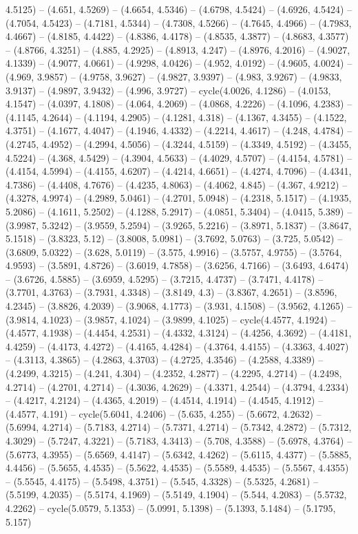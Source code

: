 4.5125) -- (4.651, 4.5269) -- (4.6654, 4.5346) -- (4.6798, 4.5424) -- (4.6926, 4.5424) -- (4.7054, 4.5423) -- (4.7181, 4.5344) -- (4.7308, 4.5266) -- (4.7645, 4.4966) -- (4.7983, 4.4667) -- (4.8185, 4.4422) -- (4.8386, 4.4178) -- (4.8535, 4.3877) -- (4.8683, 4.3577) -- (4.8766, 4.3251) -- (4.885, 4.2925) -- (4.8913, 4.247) -- (4.8976, 4.2016) -- (4.9027, 4.1339) -- (4.9077, 4.0661) -- (4.9298, 4.0426) -- (4.952, 4.0192) -- (4.9605, 4.0024) -- (4.969, 3.9857) -- (4.9758, 3.9627) -- (4.9827, 3.9397) -- (4.983, 3.9267) -- (4.9833, 3.9137) -- (4.9897, 3.9432) -- (4.996, 3.9727) -- cycle(4.0026, 4.1286) -- (4.0153, 4.1547) -- (4.0397, 4.1808) -- (4.064, 4.2069) -- (4.0868, 4.2226) -- (4.1096, 4.2383) -- (4.1145, 4.2644) -- (4.1194, 4.2905) -- (4.1281, 4.318) -- (4.1367, 4.3455) -- (4.1522, 4.3751) -- (4.1677, 4.4047) -- (4.1946, 4.4332) -- (4.2214, 4.4617) -- (4.248, 4.4784) -- (4.2745, 4.4952) -- (4.2994, 4.5056) -- (4.3244, 4.5159) -- (4.3349, 4.5192) -- (4.3455, 4.5224) -- (4.368, 4.5429) -- (4.3904, 4.5633) -- (4.4029, 4.5707) -- (4.4154, 4.5781) -- (4.4154, 4.5994) -- (4.4155, 4.6207) -- (4.4214, 4.6651) -- (4.4274, 4.7096) -- (4.4341, 4.7386) -- (4.4408, 4.7676) -- (4.4235, 4.8063) -- (4.4062, 4.845) -- (4.367, 4.9212) -- (4.3278, 4.9974) -- (4.2989, 5.0461) -- (4.2701, 5.0948) -- (4.2318, 5.1517) -- (4.1935, 5.2086) -- (4.1611, 5.2502) -- (4.1288, 5.2917) -- (4.0851, 5.3404) -- (4.0415, 5.389) -- (3.9987, 5.3242) -- (3.9559, 5.2594) -- (3.9265, 5.2216) -- (3.8971, 5.1837) -- (3.8647, 5.1518) -- (3.8323, 5.12) -- (3.8008, 5.0981) -- (3.7692, 5.0763) -- (3.725, 5.0542) -- (3.6809, 5.0322) -- (3.628, 5.0119) -- (3.575, 4.9916) -- (3.5757, 4.9755) -- (3.5764, 4.9593) -- (3.5891, 4.8726) -- (3.6019, 4.7858) -- (3.6256, 4.7166) -- (3.6493, 4.6474) -- (3.6726, 4.5885) -- (3.6959, 4.5295) -- (3.7215, 4.4737) -- (3.7471, 4.4178) -- (3.7701, 4.3763) -- (3.7931, 4.3348) -- (3.8149, 4.3) -- (3.8367, 4.2651) -- (3.8596, 4.2345) -- (3.8826, 4.2039) -- (3.9068, 4.1773) -- (3.931, 4.1508) -- (3.9562, 4.1265) -- (3.9814, 4.1023) -- (3.9857, 4.1024) -- (3.9899, 4.1025) -- cycle(4.4577, 4.1924) -- (4.4577, 4.1938) -- (4.4454, 4.2531) -- (4.4332, 4.3124) -- (4.4256, 4.3692) -- (4.4181, 4.4259) -- (4.4173, 4.4272) -- (4.4165, 4.4284) -- (4.3764, 4.4155) -- (4.3363, 4.4027) -- (4.3113, 4.3865) -- (4.2863, 4.3703) -- (4.2725, 4.3546) -- (4.2588, 4.3389) -- (4.2499, 4.3215) -- (4.241, 4.304) -- (4.2352, 4.2877) -- (4.2295, 4.2714) -- (4.2498, 4.2714) -- (4.2701, 4.2714) -- (4.3036, 4.2629) -- (4.3371, 4.2544) -- (4.3794, 4.2334) -- (4.4217, 4.2124) -- (4.4365, 4.2019) -- (4.4514, 4.1914) -- (4.4545, 4.1912) -- (4.4577, 4.191) -- cycle(5.6041, 4.2406) -- (5.635, 4.255) -- (5.6672, 4.2632) -- (5.6994, 4.2714) -- (5.7183, 4.2714) -- (5.7371, 4.2714) -- (5.7342, 4.2872) -- (5.7312, 4.3029) -- (5.7247, 4.3221) -- (5.7183, 4.3413) -- (5.708, 4.3588) -- (5.6978, 4.3764) -- (5.6773, 4.3955) -- (5.6569, 4.4147) -- (5.6342, 4.4262) -- (5.6115, 4.4377) -- (5.5885, 4.4456) -- (5.5655, 4.4535) -- (5.5622, 4.4535) -- (5.5589, 4.4535) -- (5.5567, 4.4355) -- (5.5545, 4.4175) -- (5.5498, 4.3751) -- (5.545, 4.3328) -- (5.5325, 4.2681) -- (5.5199, 4.2035) -- (5.5174, 4.1969) -- (5.5149, 4.1904) -- (5.544, 4.2083) -- (5.5732, 4.2262) -- cycle(5.0579, 5.1353) -- (5.0991, 5.1398) -- (5.1393, 5.1484) -- (5.1795, 5.157) 